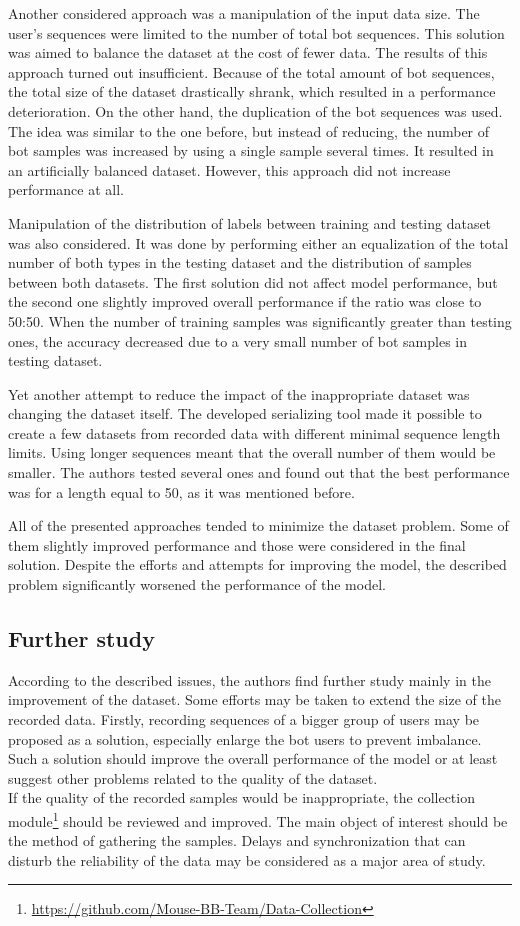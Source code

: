Another considered approach was a manipulation of the input data size.
The user's sequences were limited to the number of total bot sequences.
This solution was aimed to balance the dataset at the cost of fewer data.
The results of this approach turned out insufficient.
Because of the total amount of bot sequences, the total size of the dataset drastically shrank, which resulted in a performance deterioration.
On the other hand, the duplication of the bot sequences was used.
The idea was similar to the one before, but instead of reducing, the number of bot samples was increased by using a single sample several times.
It resulted in an artificially balanced dataset.
However, this approach did not increase performance at all.

Manipulation of the distribution of labels between training and testing dataset was also considered.
It was done by performing either an equalization of the total number of both types in the testing dataset and the distribution of samples between both datasets.
The first solution did not affect model performance, but the second one slightly improved overall performance if the ratio was close to 50:50.
When the number of training samples was significantly greater than testing ones, the accuracy decreased due to a very small number of bot samples in testing dataset.

Yet another attempt to reduce the impact of the inappropriate dataset was changing the dataset itself.
The developed serializing tool made it possible to create a few datasets from recorded data with different minimal sequence length limits.
Using longer sequences meant that the overall number of them would be smaller.
The authors tested several ones and found out that the best performance was for a length equal to 50, as it was mentioned before.

All of the presented approaches tended to minimize the dataset problem.
Some of them slightly improved performance and those were considered in the final solution.
Despite the efforts and attempts for improving the model, the described problem significantly worsened the performance of the model.

\subsection{Further study}\label{subsec:further-study}
According to the described issues, the authors find further study mainly in the improvement of the dataset.
Some efforts may be taken to extend the size of the recorded data.
Firstly, recording sequences of a bigger group of users may be proposed as a solution, especially enlarge the bot users to prevent imbalance.
Such a solution should improve the overall performance of the model or at least suggest other problems related to the quality of the dataset.\\
If the quality of the recorded samples would be inappropriate, the collection module\footnote{\url{https://github.com/Mouse-BB-Team/Data-Collection}} should be reviewed and improved.
The main object of interest should be the method of gathering the samples.
Delays and synchronization that can disturb the reliability of the data may be considered as a major area of study.

